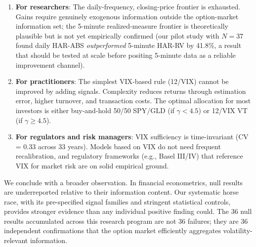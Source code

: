 \documentclass[12pt,a4paper]{article}
\begin{document}
\begin{enumerate}
    \item \textbf{For researchers}: The daily-frequency, closing-price frontier is exhausted. Gains require genuinely exogenous information outside the option-market information set; the 5-minute realized-measure frontier is theoretically plausible but is not yet empirically confirmed (our pilot study with $N = 37$ found daily HAR-ABS \emph{outperformed} 5-minute HAR-RV by 41.8\%, a result that should be tested at scale before positing 5-minute data as a reliable improvement channel).

    \item \textbf{For practitioners}: The simplest VIX-based rule (12/VIX) cannot be improved by adding signals. Complexity reduces returns through estimation error, higher turnover, and transaction costs. The optimal allocation for most investors is either buy-and-hold 50/50 SPY/GLD (if $\gamma < 4.5$) or 12/VIX VT (if $\gamma \geq 4.5$).

    \item \textbf{For regulators and risk managers}: VIX sufficiency is time-invariant (CV = 0.33 across 33 years). Models based on VIX do not need frequent recalibration, and regulatory frameworks (e.g., Basel III/IV) that reference VIX for market risk are on solid empirical ground.
\end{enumerate}

We conclude with a broader observation. In financial econometrics, null results are underreported relative to their information content. Our systematic horse race, with its pre-specified signal families and stringent statistical controls, provides stronger evidence than any individual positive finding could. The 36 null results accumulated across this research program are not 36 failures; they are 36 independent confirmations that the option market efficiently aggregates volatility-relevant information.


\end{document}
